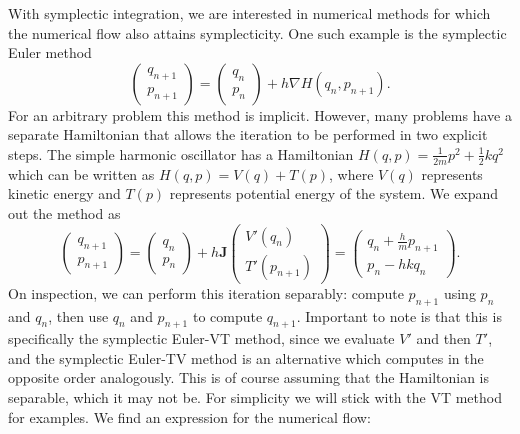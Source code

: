 \documentclass{report}
\theoremstyle{exampstyle} \newtheorem{example}[theorem]{Example}
\theoremstyle{exampstyle} \newtheorem{remark}[theorem]{Remark}
\theoremstyle{exampstyle} \newtheorem{definition}[theorem]{Definition}
\theoremstyle{exampstyle} \newtheorem{lemma}[theorem]{Lemma}
\theoremstyle{exampstyle} \newtheorem{proposition}[theorem]{Proposition}
\begin{document}
With symplectic integration, we are interested in numerical methods for which the numerical flow also attains symplecticity.
One such example is the symplectic Euler method
\begin{equation*}
	\begin{pmatrix}
		q_{n+1} \\
		p_{n+1} 
	\end{pmatrix} = \begin{pmatrix}
		q_{n} \\
		p_{n}
	\end{pmatrix} + h \nabla H(q_{n}, p_{n+1}).
\end{equation*}
For an arbitrary problem this method is implicit. However, many problems have a separate Hamiltonian that allows the iteration to be performed in two explicit steps. 
The simple harmonic oscillator has a Hamiltonian $H(q, p) = \frac{1}{2m}p^2 + \frac{1}{2}kq^2$ which can be written as $H(q, p) = V(q) + T(p)$, where $V(q)$ represents kinetic energy and $T(p)$ represents potential energy of the system.
We expand out the method as
\begin{equation*}
	\begin{pmatrix}
		q_{n+1} \\
		p_{n+1} 
	\end{pmatrix} = \begin{pmatrix}
		q_{n} \\
		p_{n}
	\end{pmatrix} + h \mathbf{J} \begin{pmatrix}
		V'(q_n) \\
		T'(p_{n+1})
	\end{pmatrix} = \begin{pmatrix}
		q_{n} + \frac{h}{m}p_{n+1} \\
		p_{n} - hk q_n
	\end{pmatrix}.
\end{equation*}
On inspection, we can perform this iteration separably: compute $p_{n+1}$ using $p_n$ and $q_n$,
then use $q_n$ and $p_{n+1}$ to compute $q_{n+1}$.
Important to note is that this is specifically the symplectic Euler-VT method, since we evaluate $V'$ and then $T'$,
and the symplectic Euler-TV method is an alternative which computes in the opposite order analogously.
This is of course assuming that the Hamiltonian is separable, which it may not be.
For simplicity we will stick with the VT method for examples.
We find an expression for the numerical flow:
\end{document}
